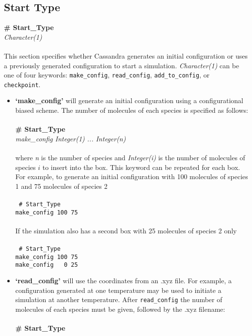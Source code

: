 \subsection{Start Type}\label{sec:Start_Type}
{\bf \# Start\_Type} \\
{\it Character(1) } \\ \\
%
This section specifies whether Cassandra generates an initial configuration or 
uses a previously generated configuration to start a simulation. 
{\it Character(1)} can be one of four keywords:
{\tt make\_config}, {\tt read\_config}, {\tt add\_to\_config}, or {\tt checkpoint}.
%
\begin{itemize} 
\item \textbf{`make\_config'} will generate an initial configuration using a configurational biased scheme. 
The number of molecules of each species is specified as follows: \\ \\
%
{\bf \# Start\_Type} \\
{\it make\_config Integer(1) ... Integer(n)} \\ \\
%
where {\it n} is the number of species and {\it Integer(i)} is the number of molecules of species $i$ to insert into the box. 
This keyword can be repeated for each box. 
For example, to generate an initial configuration with 100 molecules of species 1 and 75 molecules of species 2 \\ \\
%
 \texttt{
 \# Start\_Type \\
 make\_config 100 75 \\} \\
%
If the simulation also has a second box with 25 molecules of species 2 only \\ \\
%
 \texttt{
 \# Start\_Type \\
 make\_config 100 75\\
 make\_config \ \ 0 25\\}
%
\item {\textbf{`read\_config'}} will use the coordinates from an .xyz file.
For example, a configuration generated at one temperature may be used to initiate a simulation at another temperature. 
After {\tt read\_config} the number of molecules of each species must be given, followed by the .xyz filename: \\ \\
%
{\bf \# Start\_Type} \\

\end{itemize}
